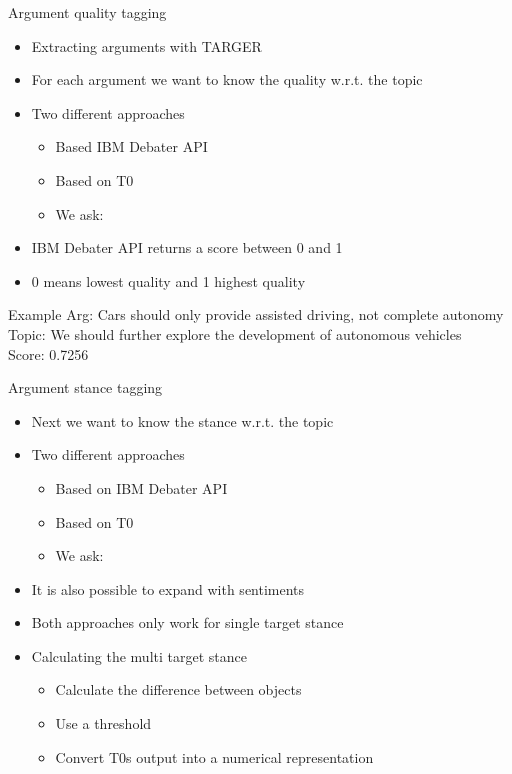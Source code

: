 \documentclass[english]{mlutalk}
\begin{document}
\begin{frame}{Argument quality tagging}
    \begin{itemize}
        \item Extracting arguments with TARGER~\cite{ChernodubOHBHBP2019}
        \item For each argument we want to know the quality w.r.t. the topic
        \item Two different approaches
        \begin{itemize}
            \item Based IBM Debater API~\cite{ToledoG2019}
            \item Based on T0
            \item We ask: 
        \end{itemize}
        \item IBM Debater API returns a score between 0 and 1
        \item 0 means lowest quality and 1 highest quality
    \end{itemize}
    \begin{block}{Example}
        Arg: Cars should only provide assisted driving, not complete autonomy\\
        Topic: We should further explore the development of autonomous vehicles\\
        Score: 0.7256
    \end{block}
\end{frame}

\begin{frame}{Argument stance tagging}
    \begin{itemize}
        \item Next we want to know the stance w.r.t. the topic
        \item Two different approaches
        \begin{itemize}
            \item Based on IBM Debater API~\cite{BarHaimBDSS2017}
            \item Based on T0
            \item We ask: 
        \end{itemize}
        \item It is also possible to expand with sentiments
        \item Both approaches only work for single target stance
        \item Calculating the multi target stance
        \begin{itemize}
            \item Calculate the difference between objects
            \item Use a threshold
            \item Convert T0s output into a numerical representation
        \end{itemize}
    \end{itemize}
\end{frame}
\end{document}
